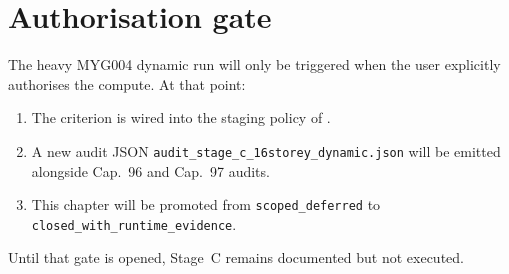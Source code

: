 \section{Authorisation gate}

The heavy MYG004 dynamic run will only be triggered when the user
explicitly authorises the compute. At that point:
\begin{enumerate}
  \item The criterion is wired into the staging policy of
        .
  \item A new audit JSON \texttt{audit\_stage\_c\_16storey\_dynamic.json}
        will be emitted alongside Cap.~96 and Cap.~97 audits.
  \item This chapter will be promoted from
        \texttt{scoped\_deferred} to \texttt{closed\_with\_runtime\_evidence}.
\end{enumerate}

Until that gate is opened, Stage~C remains documented but not executed.
